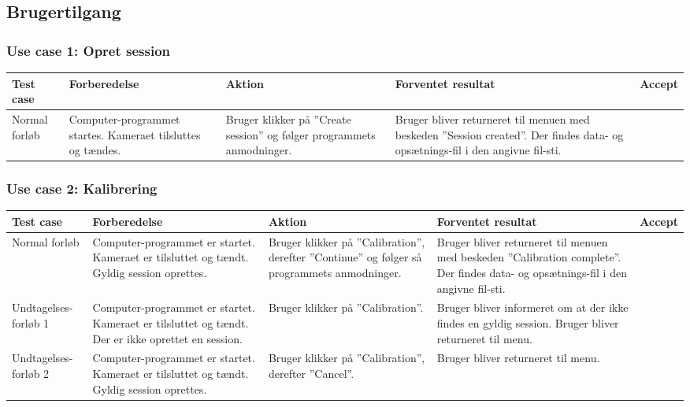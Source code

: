 \documentclass[accepttest.tex]{subfiles}
\begin{document}
\subsection{Brugertilgang}
\subsubsection{Use case 1: Opret session}

\begin{table}[H]
	\small
\begin{tabular}{|p{2cm}|p{3cm}|p{3cm}|p{3cm}|l|}
	\hline Test case & Forberedelse & Aktion & Forventet resultat & Accept \\ 
	\hline Normal forløb & Computer-programmet startes.  Kameraet tilsluttes og tændes.  & Bruger klikker på ”Create session” og følger programmets anmodninger. & Bruger bliver returneret til menuen med beskeden ”Session created”. Der findes data- og opsætnings-fil i den angivne fil-sti. & {\Huge\checkmark} \\ 
	\hline 
\end{tabular} 
\end{table}

\subsubsection{Use case 2: Kalibrering}
\begin{table}[H]
	\small
\begin{tabular}{|p{2cm}|p{3cm}|p{3cm}|p{3cm}|l|}
	\hline Test case & Forberedelse & Aktion & Forventet resultat & Accept \\ 
	\hline Normal forløb & Computer-programmet er startet. Kameraet er tilsluttet og tændt. 
	Gyldig session oprettes. & Bruger klikker på ”Calibration”, derefter ”Continue” og følger så programmets anmodninger. & Bruger bliver returneret til menuen med beskeden ”Calibration complete”. Der findes data- og opsætnings-fil i den angivne fil-sti. & \\
	
	\hline Undtagelses-forløb 1 & Computer-programmet er startet. Kameraet er tilsluttet og tændt. Der er ikke oprettet en session. & Bruger klikker på ”Calibration”. & Bruger bliver informeret om at der ikke findes en gyldig session. Bruger bliver returneret til menu. &\\
	\hline Undtagelses-forløb 2 & Computer-programmet er startet. Kameraet er tilsluttet og tændt. 
	Gyldig session oprettes. & Bruger klikker på ”Calibration”, derefter ”Cancel”. & Bruger bliver returneret til menu. & \\
		\hline 
\end{tabular}
\end{table}
\end{document}
